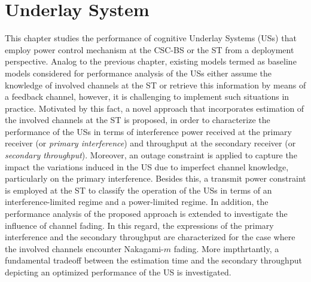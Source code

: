\chapter{Underlay System}
\label{chap:US}


This chapter studies the performance of cognitive Underlay Systems (USs) that employ power control mechanism at the CSC-BS or the ST from a deployment perspective. Analog to the previous chapter, existing models termed as baseline models considered for performance analysis of the USs either assume the knowledge of involved channels at the ST or retrieve this information by means of a feedback channel, however, it is challenging to implement such situations in practice. Motivated by this fact, a novel approach that incorporates estimation of the involved channels at the ST is proposed, in order to characterize the performance of the USs in terms of interference power received at the primary receiver (or \textit{primary interference}) and throughput at the secondary receiver (or \textit{secondary throughput}). Moreover, an outage constraint is applied to capture the impact the variations induced in the US due to imperfect channel knowledge, particularly on the primary interference. 
Besides this, a transmit power constraint is employed at the ST to classify the operation of the USs in terms of an interference-limited regime and a power-limited regime. In addition, the performance analysis of the proposed approach is extended to investigate the influence of channel fading. In this regard, the expressions of the primary interference and the secondary throughput are characterized for the case where the involved channels encounter Nakagami-$m$ fading. More impthrtantly, a fundamental tradeoff between the estimation time and the secondary throughput depicting an optimized performance of the US is investigated. 

